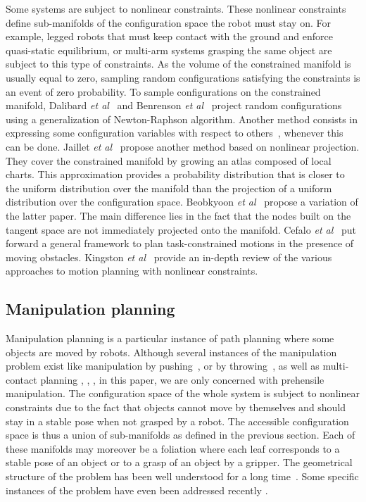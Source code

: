 Some systems are subject to nonlinear constraints. These nonlinear
constraints define sub-manifolds of the configuration space the robot
must stay on. For example, legged robots that must keep contact with
the ground and enforce quasi-static equilibrium, or multi-arm systems
grasping the same object are subject to this type of constraints. As the
volume of the constrained manifold is usually equal to zero, sampling
random configurations satisfying the constraints is an event of zero
probability. To sample configurations on the constrained manifold,
{\color{blue}Dalibard \textit{et al}}~\cite{DalNakLamLau2009} and {\color{blue}Benrenson
\textit{et al}}~\cite{berenson2011} project random configurations using
a generalization of Newton-Raphson algorithm. Another method consists in expressing some
configuration variables with respect to others~\cite{Cortes2002},
\cite{MirLam2018} whenever this can be done. {\color{blue}Jaillet \textit{et al}}~\cite{atlasRRT} propose
another method based on nonlinear projection. They cover the
constrained manifold by growing an atlas composed of local
charts. This approximation provides a probability distribution that is
closer to the uniform distribution over the manifold than the
projection of a uniform distribution over the configuration
space. {\color{blue}Beobkyoon \textit{et al}}~\cite{tb-rrt2016} propose a variation of the latter paper.  The
main difference lies in the fact that the nodes built on the
tangent space are not immediately projected onto the manifold.
{\color{blue}Cefalo \textit{et al}}~\cite{CefOri2019} put forward a general framework to plan task-constrained
motions in the presence of moving obstacles. {\color{blue}Kingston \textit{et al}}~\cite{KinMolKav2019}
provide an in-depth review of the various approaches to motion
planning with nonlinear constraints.

\subsection{Manipulation planning}

Manipulation planning is a particular instance of path planning where
some objects are moved by robots.
Although several instances of the
manipulation problem exist like manipulation by
pushing~\cite{BenRiv1998}, or by throwing~\cite{WooZacLyn2017}, as well as
multi-contact planning \cite{Bretl2006}, \cite{LenVaiYosKhe2013},
\cite{TonDelPetParManMan2018}, in this paper, we are only concerned with
prehensile manipulation.
The configuration space of the whole system is subject to
nonlinear constraints due to the fact that objects cannot move by
themselves and should stay in a stable pose when not grasped by a
robot.  The accessible configuration space is thus a union of
sub-manifolds as defined in the previous section. Each of these
manifolds may moreover be a foliation where each leaf corresponds to a
stable pose of an object or to a grasp of an object by a
gripper. The geometrical structure of the problem has been well
understood for a long time~\cite{AlaSimLau89}. Some specific instances of the
problem have even been addressed recently \cite{vendittelli-2018}.

